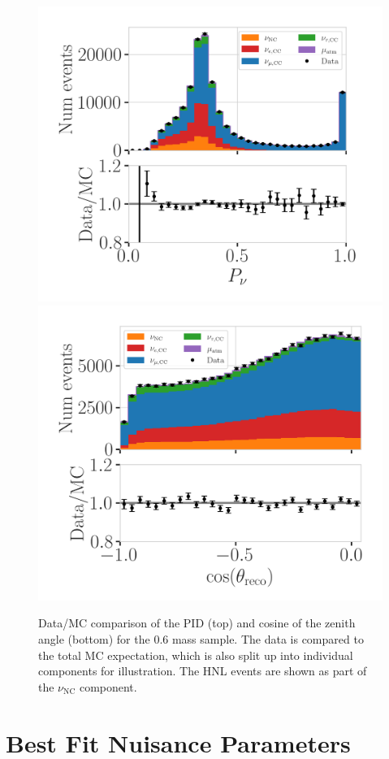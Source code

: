 \begin{figure}[h]
    \includegraphics[width=0.49\linewidth]{figures/results/best_fit/pid_data_mc_agreement.png}
    \includegraphics[width=0.49\linewidth]{figures/results/best_fit/reco_coszen_data_mc_agreement.png}
	\caption[PID and cosine of the zenith angle data/MC comparison]{Data/MC comparison of the PID (top) and cosine of the zenith angle (bottom) for the \SI{0.6}{\gev} mass sample. The data is compared to the total MC expectation, which is also split up into individual components for illustration. The HNL events are shown as part of the $\nu_\mathrm{NC}$ component.}
\end{figure}


\section{Best Fit Nuisance Parameters}

